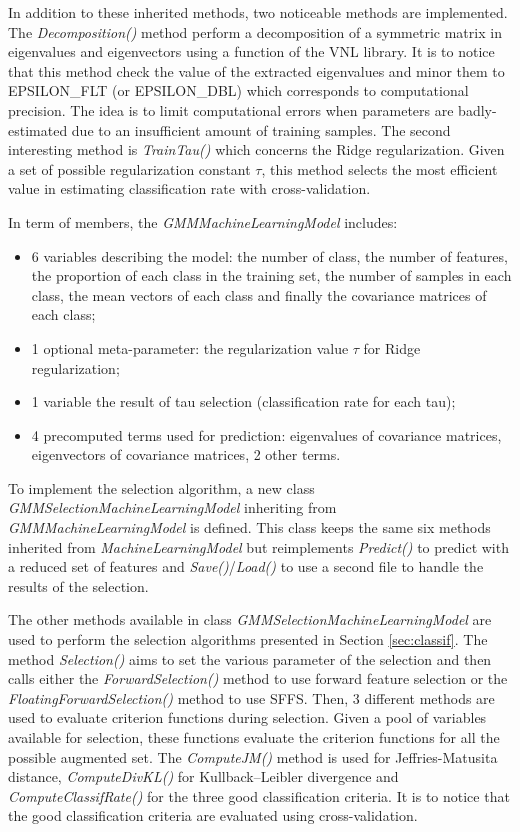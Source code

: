 \documentclass[a4paper,11pt,DIV=16,abstracton]{scrartcl}
\begin{document}
    In addition to these inherited methods, two noticeable methods are implemented. The \emph{Decomposition()} method perform a decomposition of a symmetric matrix in eigenvalues and eigenvectors using a function of the VNL library. It is to notice that this method check the value of the extracted eigenvalues and minor them to EPSILON\_FLT (or EPSILON\_DBL) which corresponds to computational precision.  The idea is to limit computational errors when parameters are badly-estimated due to an insufficient amount of training samples. The second interesting method is \emph{TrainTau()} which concerns the Ridge regularization. Given a set of possible regularization constant $\tau$, this method selects the most efficient value in estimating classification rate with cross-validation.

    In term of members, the \emph{GMMMachineLearningModel} includes:
    \begin{itemize}
        \item 6 variables describing the model: the number of class, the number of features, the proportion of each class in the training set, the number of samples in each class, the mean vectors of each class and finally the covariance matrices of each class;
        \item 1 optional meta-parameter: the regularization value $\tau$ for Ridge regularization;
        \item 1 variable the result of tau selection (classification rate for each tau);
        \item 4 precomputed terms used for prediction: eigenvalues of covariance matrices, eigenvectors of covariance matrices, 2 other terms.
    \end{itemize}

    To implement the selection algorithm, a new class \emph{GMMSelectionMachineLearningModel} inheriting from \emph{GMMMachineLearningModel} is defined. This class keeps the same six methods inherited from \emph{MachineLearningModel} but reimplements \emph{Predict()} to predict with a reduced set of features and  \emph{Save()}/\emph{Load()} to use a second file to handle the results of the selection.

    The other methods available in class \emph{GMMSelectionMachineLearningModel} are used to perform the selection algorithms presented in Section \ref{sec:classif}. The method \emph{Selection()} aims to set the various parameter of the selection and then calls either the \emph{ForwardSelection()} method to use forward feature selection or the \emph{FloatingForwardSelection()} method to use SFFS. Then, 3 different methods are used to evaluate criterion functions during selection. Given a pool of variables available for selection, these functions evaluate the criterion functions for all the possible augmented set. The \emph{ComputeJM()} method is used for Jeffries-Matusita distance, \emph{ComputeDivKL()} for Kullback–Leibler divergence and \emph{ComputeClassifRate()} for the three good classification criteria. It is to notice that the good classification criteria are evaluated using cross-validation.
\end{document}
